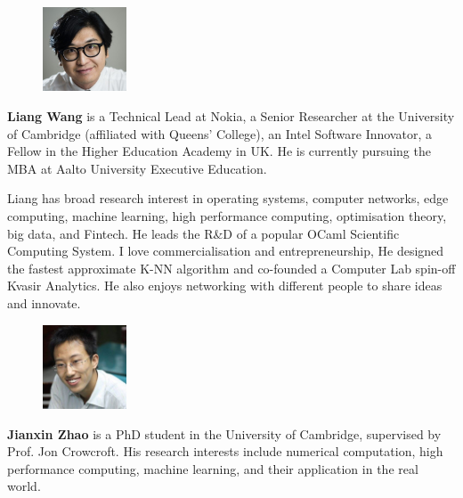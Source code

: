 \begin{figure} 
    \includegraphics[width=25mm,height=25mm,clip,keepaspectratio]{../static/images/asset/liang.jpg}
\end{figure}\par
\textbf{Liang Wang} is a Technical Lead at Nokia, a Senior Researcher at the University of Cambridge (affiliated with Queens' College), an Intel Software Innovator, a Fellow in the Higher Education Academy in UK. He is currently pursuing the MBA at Aalto University Executive Education. 

Liang has broad research interest in operating systems, computer networks, edge computing, machine learning, high performance computing, optimisation theory, big data, and Fintech. He leads the R\&D of a popular OCaml Scientific Computing System. I love commercialisation and entrepreneurship, He designed the fastest approximate K-NN algorithm and co-founded a Computer Lab spin-off Kvasir Analytics. He also enjoys networking with different people to share ideas and innovate.\par

\vspace{3cm}

\begin{figure} 
    \vspace{-4mm}
    \includegraphics[width=25mm,height=25mm,clip,keepaspectratio]{../static/images/asset/jianxin.jpg}
\end{figure}\par
\textbf{Jianxin Zhao} is a PhD student in the University of Cambridge, supervised by Prof. Jon Crowcroft. His research interests include numerical computation, high performance computing, machine learning, and their application in the real world.\par


\clearpage